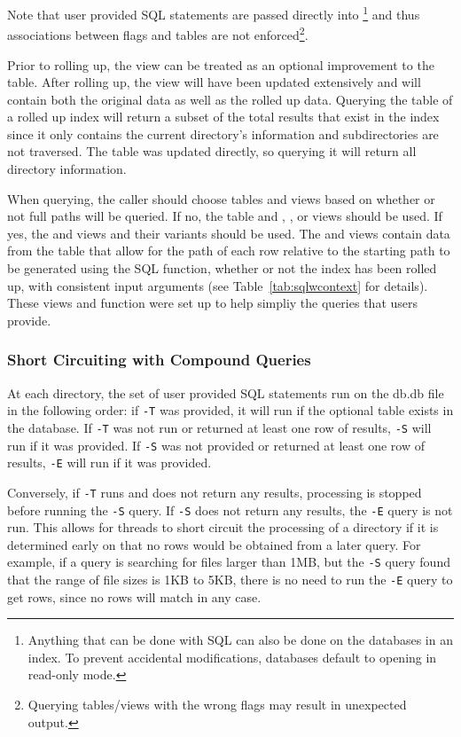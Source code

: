 Note that user provided SQL statements are passed directly into
\sqlite\footnote{Anything that can be done with SQL can also be done on
  the databases in an index. To prevent accidental modifications,
  databases default to opening in read-only mode.} and thus
associations between flags and tables are not
enforced\footnote{Querying tables/views with the wrong flags may
  result in unexpected output.}.

Prior to rolling up, the \pentries view can be treated as an optional
improvement to the \entries table. After rolling up, the \pentries
view will have been updated extensively and will contain both the
original \entries data as well as the rolled up data. Querying the
\entries table of a rolled up index will return a subset of the total
results that exist in the index since it only contains the current
directory's information and subdirectories are not traversed. The
\summary table was updated directly, so querying it will return all
directory information.

When querying, the caller should choose tables and views based on
whether or not full paths will be queried. If no, the \summary table
and \pentries, \xpentries, or \epentries views should be used. If yes,
the \vrpentries and \vrsummary views and their variants should be
used. The \vrpentries and \vrsummary views contain data from the
\summary table that allow for the path of each row relative to the
starting path to be generated using the \rpath SQL function, whether
or not the index has been rolled up, with consistent input arguments
(see Table~\ref{tab:sqlwcontext} for details). These views and
function were set up to help simpliy the queries that users provide.

\subsubsection{Short Circuiting with Compound Queries}
At each directory, the set of user provided SQL statements run on the
db.db file in the following order: if \texttt{-T} was provided, it
will run if the optional \treesummary table exists in the database. If
\texttt{-T} was not run or returned at least one row of results,
\texttt{-S} will run if it was provided. If \texttt{-S} was not
provided or returned at least one row of results, \texttt{-E} will run
if it was provided.

Conversely, if \texttt{-T} runs and does not return any results,
processing is stopped before running the \texttt{-S} query. If
\texttt{-S} does not return any results, the \texttt{-E} query is not
run. This allows for threads to short circuit the processing of a
directory if it is determined early on that no rows would be obtained
from a later query. For example, if a query is searching for files
larger than 1MB, but the \texttt{-S} query found that the range of
file sizes is 1KB to 5KB, there is no need to run the \texttt{-E}
query to get rows, since no rows will match in any case.

